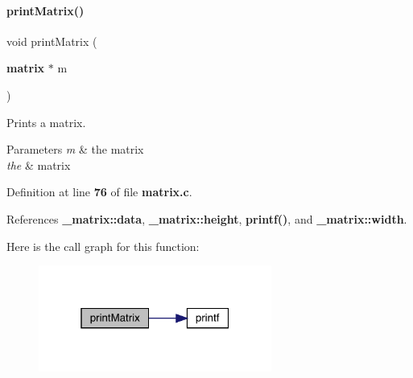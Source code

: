\paragraph{print\+Matrix()}
{\footnotesize\ttfamily void print\+Matrix (\begin{DoxyParamCaption}\item[{\textbf{ matrix} $\ast$}]{m }\end{DoxyParamCaption})}



Prints a matrix. 


\begin{DoxyParams}{Parameters}
{\em m} & the matrix\\
\hline
{\em the} & matrix \\
\hline
\end{DoxyParams}


Definition at line \textbf{ 76} of file \textbf{ matrix.\+c}.



References \textbf{ \+\_\+matrix\+::data}, \textbf{ \+\_\+matrix\+::height}, \textbf{ printf()}, and \textbf{ \+\_\+matrix\+::width}.


Here is the call graph for this function\+:
\nopagebreak
\begin{figure}[H]
\begin{center}
\leavevmode
\includegraphics[width=217pt]{matrix_8h_a50ab2b1ac33d6993d93522fc4f30a051_cgraph}
\end{center}
\end{figure}
\mbox{\label{matrix_8h_acdd57777a972ce339153878fa917db14}} 
